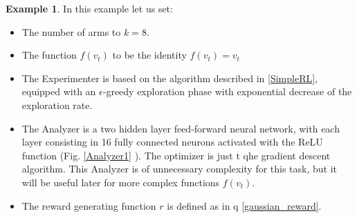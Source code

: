 \documentclass[11pt,a4paper,twoside]{report}
\newcommand{\+}{\textnormal{+} }
\theoremstyle{definition}
\newtheorem{myex}[mythm]{Example}
\numberwithin{equation}{chapter}
\begin{document}
\begin{myex}
    In this example let us set:

    \begin{itemize}
      \item The number of arms to $k=8$.
      \item The function $f(v_t)$ to be the identity $f(v_t)=v_t$
      \item The Experimenter is based on the algorithm described in
      \ref{SimpleRL}, equipped with an $\epsilon$-greedy exploration phase with
      exponential decrease of the exploration rate. 
      \item The Analyzer is a two hidden layer feed-forward neural network, with
      each layer consisting in 16 fully connected neurons activated with the
      ReLU function (Fig. \ref{Analyzer1} ). The optimizer is just t qhe
      gradient descent algorithm. This Analyzer is of unnecessary complexity for
      this task, but it will be useful later for more complex functions
      $f(v_t)$.
      \item The reward generating function $r$ is defined as in q
      \eqref{gaussian_reward}.
    \end{itemize}


\end{myex}
\end{document}
